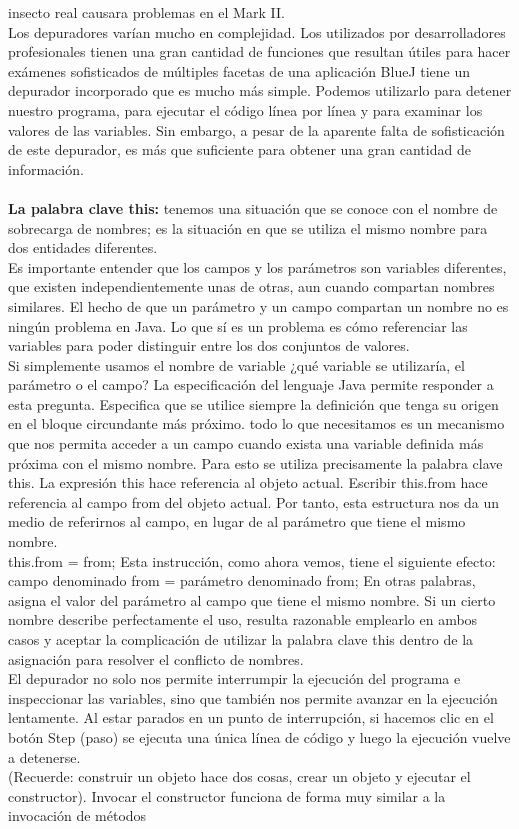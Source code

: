 \documentclass[11pt,a4paper]{article}
\begin{document}
	insecto real causara problemas en el Mark II.\\
	Los depuradores varían mucho en complejidad. Los utilizados por desarrolladores profesionales
	tienen una gran cantidad de funciones que resultan útiles para hacer exámenes sofisticados de múltiples
	facetas de una aplicación BlueJ tiene un depurador incorporado que es mucho más simple.
	Podemos utilizarlo para detener nuestro programa, para ejecutar el código línea por línea y para
	examinar los valores de las variables. Sin embargo, a pesar de la aparente falta de sofisticación de
	este depurador, es más que suficiente para obtener una gran cantidad de información.\\
	\\
	\textbf{La palabra clave this:} tenemos una situación que se conoce con el nombre
	de sobrecarga de nombres; es la situación en que se utiliza el mismo nombre para dos entidades
	diferentes.\\
	Es importante entender que los campos y los
	parámetros son variables diferentes, que existen independientemente unas de otras, aun cuando
	compartan nombres similares. El hecho de que un parámetro y un campo compartan un nombre no
	es ningún problema en Java.
	Lo que sí es un problema es cómo referenciar las variables para poder distinguir entre los
	dos conjuntos de valores.\\
	Si simplemente usamos el nombre de variable ¿qué variable se utilizaría, el
	parámetro o el campo?
	La especificación del lenguaje Java permite responder a esta pregunta. Especifica que se utilice
	siempre la definición que tenga su origen en el bloque circundante más próximo. todo lo que necesitamos es un mecanismo que nos permita acceder a un campo cuando
	exista una variable definida más próxima con el mismo nombre. Para esto se utiliza precisamente
	la palabra clave this. La expresión this hace referencia al objeto actual. Escribir this.from
	hace referencia al campo from del objeto actual. Por tanto, esta estructura nos da un medio de
	referirnos al campo, en lugar de al parámetro que tiene el mismo nombre.\\
	this.from = from;
	Esta instrucción, como ahora vemos, tiene el siguiente efecto:
	campo denominado from = parámetro denominado from;
	En otras palabras, asigna el valor del parámetro al campo que tiene el mismo nombre. Si un cierto nombre describe perfectamente el uso,
	resulta razonable emplearlo en ambos casos y aceptar la complicación de utilizar la palabra clave
	this dentro de la asignación para resolver el conflicto de nombres.\\
	El depurador no solo nos permite interrumpir la ejecución del programa e inspeccionar las variables,
	sino que también nos permite avanzar en la ejecución lentamente. Al estar parados en un punto de interrupción, si hacemos clic en el botón Step (paso) se ejecuta una
	única línea de código y luego la ejecución vuelve a detenerse.\\
	(Recuerde: construir un objeto hace
	dos cosas, crear un objeto y ejecutar el constructor). Invocar el constructor funciona de forma muy
	similar a la invocación de métodos
\end{document}
